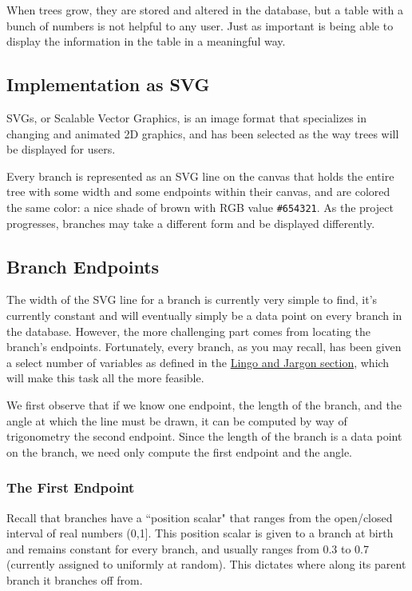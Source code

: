 When trees grow, they are stored and altered in the database, but a table with a bunch of numbers is not helpful to any user. Just as important is being able to display the information in the table in a meaningful way.

\subsection{Implementation as SVG}

SVGs, or Scalable Vector Graphics, is an image format that specializes in changing and animated 2D graphics, and has been selected as the way trees will be displayed for users.

Every branch is represented as an SVG line on the canvas that holds the entire tree with some width and some endpoints within their canvas, and are colored the same color: a nice shade of brown with RGB value \verb|#654321|. As the project progresses, branches may take a different form and be displayed differently.

\hypertarget{branchpoints}{\subsection{Branch Endpoints}}

The width of the SVG line for a branch is currently very simple to find, it's currently constant and will eventually simply be a data point on every branch in the database. However, the more challenging part comes from locating the branch's endpoints. Fortunately, every branch, as you may recall, has been given a select number of variables as defined in the \hyperlink{lingo}{Lingo and Jargon section}, which will make this task all the more feasible.

We first observe that if we know one endpoint, the length of the branch, and the angle at which the line must be drawn, it can be computed by way of trigonometry the second endpoint. Since the length of the branch is a data point on the branch, we need only compute the first endpoint and the angle.

\subsubsection{The First Endpoint}

Recall that branches have a ``position scalar" that ranges from the open/closed interval of real numbers (0,1]. This position scalar is given to a branch at birth and remains constant for every branch, and usually ranges from 0.3 to 0.7 (currently assigned to uniformly at random). This dictates where along its parent branch it branches off from.

